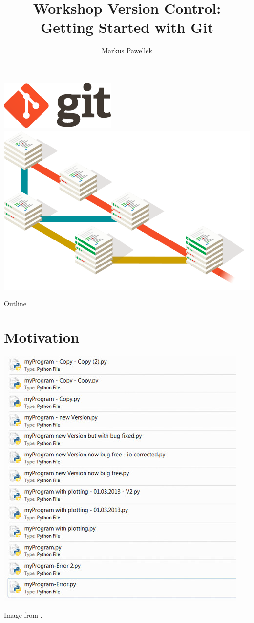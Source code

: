 \documentclass[aspectratio=169,fleqn]{beamer}
\title{%
  Workshop Version Control: \\ Getting Started with Git%
}
\author{Markus Pawellek}
\begin{document}

\begin{frame}[plain]
  \includegraphics[width=0.2\linewidth]{images/logo.png}
  \hfill
  \includegraphics[width=0.7\linewidth]{images/banner.png}
\end{frame}

\frame[plain]{\titlepage}

\begin{frame}[plain]{Outline}
  \footnotesize
  \hfill\parbox[t][7cm][l]{0.9\textwidth}{\tableofcontents}
\end{frame}

\setcounter{framenumber}{0}

\section{Motivation} %
\label{sec:motivation}

  \begin{frame}[plain]{}
    \centering
    \includegraphics[height=0.85\textheight]{images/bad-version-control-1.jpg}

    {\scriptsize Image from .}
  \end{frame}
\end{document}
